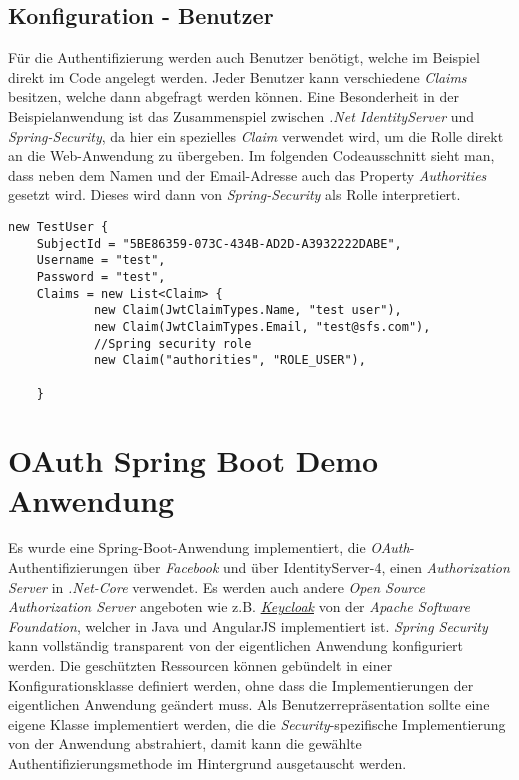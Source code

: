 \subsection*{Konfiguration - Benutzer}
Für die Authentifizierung werden auch Benutzer benötigt, welche im Beispiel direkt im Code angelegt werden. Jeder Benutzer kann verschiedene \emph{Claims} besitzen, welche dann abgefragt werden können. Eine Besonderheit in der Beispielanwendung ist das Zusammenspiel zwischen \emph{.Net IdentityServer} und \emph{Spring-Security}, da hier ein spezielles \emph{Claim} verwendet wird, um die Rolle direkt an die Web-Anwendung zu übergeben. Im folgenden Codeausschnitt sieht man, dass neben dem Namen und der Email-Adresse auch das Property \emph{Authorities} gesetzt wird. Dieses wird dann von \emph{Spring-Security} als Rolle interpretiert.

\begin{verbatim}
new TestUser {
	SubjectId = "5BE86359-073C-434B-AD2D-A3932222DABE",
	Username = "test",
	Password = "test",
	Claims = new List<Claim> {
			new Claim(JwtClaimTypes.Name, "test user"),
			new Claim(JwtClaimTypes.Email, "test@sfs.com"),
			//Spring security role
			new Claim("authorities", "ROLE_USER"),
			
	}
\end{verbatim}

\section{OAuth Spring Boot Demo Anwendung}
Es wurde eine Spring-Boot-Anwendung implementiert, die \emph{OAuth}-Authentifizierungen über \emph{Facebook} und über IdentityServer-4, einen \emph{Authorization Server} in \emph{.Net-Core} verwendet. Es werden auch andere \emph{Open Source} \emph{Authorization Server} angeboten wie z.B. \href{http://www.keycloak.org/}{\emph{Keycloak}} von der \emph{Apache Software Foundation}, welcher in Java und AngularJS implementiert ist. 
\newline
\newline
\emph{Spring Security} kann vollständig transparent von der eigentlichen Anwendung konfiguriert werden. Die geschützten Ressourcen können gebündelt in einer Konfigurationsklasse definiert werden, ohne dass die Implementierungen der eigentlichen Anwendung geändert muss. Als Benutzerrepräsentation sollte eine eigene Klasse implementiert werden, die die \emph{Security}-spezifische Implementierung von der Anwendung abstrahiert, damit kann die gewählte Authentifizierungsmethode im Hintergrund ausgetauscht werden.

